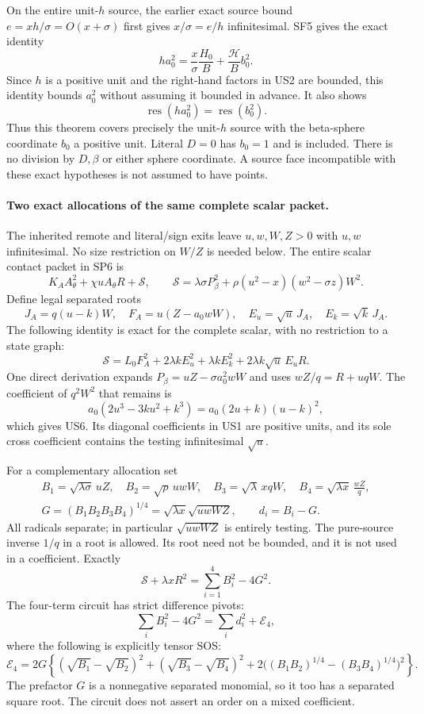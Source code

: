 On the entire unit-$h$ source, the earlier exact source bound
$e=xh/\sigma=O(x+\sigma)$ first gives $x/\sigma=e/h$
infinitesimal. SF5 gives the exact identity
\[
 h a_0^2=\frac{x}{\sigma}\frac{H_0}{B}
                    +\frac{\mathcal H}{B}b_0^2.
 \tag{US2}
\]
Since $h$ is a positive unit and the right-hand factors in US2 are
bounded, this identity bounds $a_0^2$ without assuming it bounded
in advance. It also shows
\[
        \operatorname{res}(h a_0^2)=\operatorname{res}(b_0^2).
 \tag{US3}
\]
Thus this theorem covers precisely the unit-$h$ source with the
beta-sphere coordinate $b_0$ a positive unit. Literal $D=0$ has
$b_0=1$ and is included. There is no division by $D,\beta$ or
either sphere coordinate. A source face incompatible with these
exact hypotheses is not assumed to have points.

\paragraph{Two exact allocations of the same complete scalar packet.}
The inherited remote and literal/sign exits leave $u,w,W,Z>0$ with
$u,w$ infinitesimal. No size restriction on $W/Z$ is needed below.
The entire scalar contact packet in SP6 is
\[
 K_AA_\theta^2+\chi uA_\theta R+\mathscr S,
 \qquad
 \mathscr S=\lambda\sigma P_\beta^2
       +\rho(u^2-x)(w^2-\sigma z)W^2.
 \tag{US4}
\]
Define legal separated roots
\[
 J_A=q(u-k)W,\quad
 F_A=u(Z-a_0wW),\quad
 E_u=\sqrt u\,J_A,\quad E_k=\sqrt k\,J_A.
 \tag{US5}
\]
The following identity is exact for the complete scalar, with no
restriction to a state graph:
\[
 \boxed{\mathscr S=L_0F_A^2
       +2\lambda k E_u^2+\lambda k E_k^2
       +2\lambda k\sqrt u\,E_uR.}
 \tag{US6}
\]
One direct derivation expands $P_\beta=uZ-\sigma a_0^2wW$ and
uses $wZ/q=R+uqW$. The coefficient of $q^2W^2$ that remains is
\[
 a_0(2u^3-3ku^2+k^3)=a_0(2u+k)(u-k)^2,
\]
which gives US6. Its diagonal coefficients in US1 are positive
units, and its sole cross coefficient contains the testing
infinitesimal $\sqrt u$.

For a complementary allocation set
\[
 \begin{gathered}
 B_1=\sqrt{\lambda\sigma}\,uZ,\quad
 B_2=\sqrt\rho\,uwW,\quad
 B_3=\sqrt\lambda\,xqW,\quad
 B_4=\sqrt{\lambda x}\,\frac{wZ}{q},\\
 G=(B_1B_2B_3B_4)^{1/4}
       =\sqrt{\lambda x}\sqrt{uwWZ},\qquad d_i=B_i-G.
 \end{gathered}
 \tag{US7}
\]
All radicals separate; in particular $\sqrt{uwWZ}$ is entirely
testing. The pure-source inverse $1/q$ in a root is allowed. Its
root need not be bounded, and it is not used in a coefficient.
Exactly
\[
 \boxed{\mathscr S+\lambda xR^2
               =\sum_{i=1}^4 B_i^2-4G^2.}
 \tag{US8}
\]
The four-term circuit has strict difference pivots:
\[
 \sum_iB_i^2-4G^2=\sum_i d_i^2+\mathcal E_4,
 \tag{US9}
\]
where the following is explicitly tensor SOS:
\[
 \mathcal E_4=2G\left\{
 (\sqrt{B_1}-\sqrt{B_2})^2+
 (\sqrt{B_3}-\sqrt{B_4})^2+
 2\bigl((B_1B_2)^{1/4}-(B_3B_4)^{1/4}\bigr)^2
 \right\}.
 \tag{US10}
\]
The prefactor $G$ is a nonnegative separated monomial, so it too
has a separated square root. The circuit does not assert an order
on a mixed coefficient.

